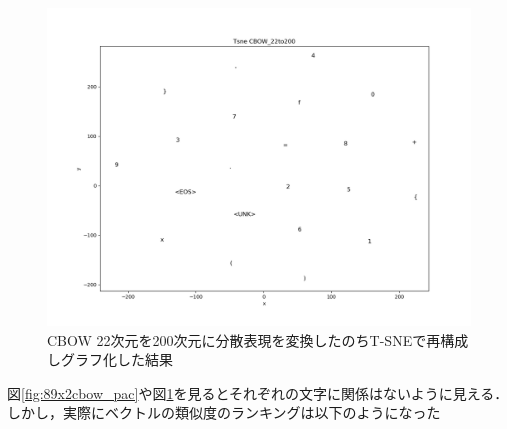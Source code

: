 \documentclass[a4j,11pt,report]{jsbook}
\begin{document}
\begin{center}
  \begin{figure}[H]
    \centering
    \includegraphics[width=\linewidth]{image/CBOW_tsne_out22_200.png}
    \caption{CBOW 22次元を200次元に分散表現を変換したのちT-SNEで再構成しグラフ化した結果}
    \label{fig:89x2cbow_tsne}
  \end{figure}
\end{center}

図\ref{fig:89x2cbow_pac}や図\ref{fig:89x2cbow_tsne}を見るとそれぞれの文字に関係はないように見える．
しかし，実際にベクトルの類似度のランキングは以下のようになった
\end{document}
